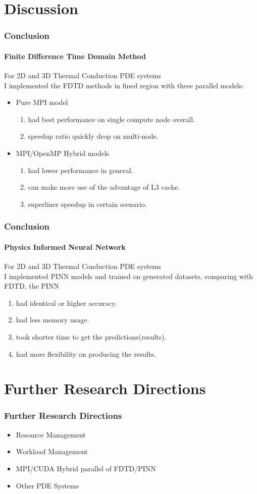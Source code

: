 \section{Discussion}



\begin{frame}
  \frametitle{Conclusion}
  \framesubtitle{Finite Difference Time Domain Method}
  For 2D and 3D Thermal Conduction PDE systems \\
  I implemented the FDTD methods in fined region with three parallel models:
  \begin{itemize}
    \item Pure MPI model 
    \begin{enumerate}
      \item had best performance on single compute node overall.
      \item speedup ratio quickly drop on multi-node.
    \end{enumerate}
    \item MPI/OpenMP Hybrid models 
    \begin{enumerate}
      \item had lower performance in general.
      \item can make more use of the advantage of L3 cache.
      \item superliner speedup in certain scenario.
    \end{enumerate}
  \end{itemize}

\end{frame}


\begin{frame}
  \frametitle{Conclusion}
  \framesubtitle{Physics Informed Neural Network}
  For 2D and 3D Thermal Conduction PDE systems \\
  I implemented PINN models and trained on generated datasets, comparing with FDTD, the PINN 
  \begin{enumerate}
    \item had identical or higher accuracy.
    \item had less memory usage.
    \item took shorter time to get the predictions(results).
    \item had more flexibility on producing the results.
  \end{enumerate}


\end{frame}


\section{Further Research Directions}
\begin{frame}
  \frametitle{Further Research Directions}
  \begin{itemize}
    \item Resource Management
    \item Workload Management
    \item MPI/CUDA Hybrid parallel of FDTD/PINN
    \item Other PDE Systems
  \end{itemize}
\end{frame}